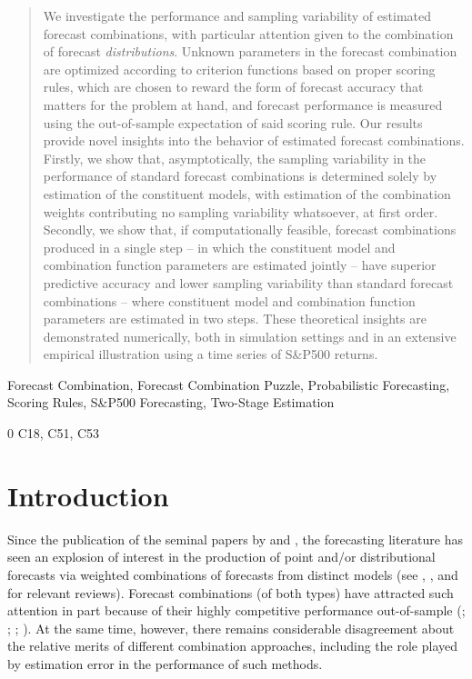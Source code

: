 \documentclass[12pt]{article}
\newcommand{\blind}{0}
\theoremstyle{definition}
\theoremstyle{remark}
\begin{document}
\bigskip
\begin{abstract}
We investigate the performance and sampling variability of estimated forecast combinations, with particular attention given to the combination of forecast \textit{distributions}. Unknown parameters in the forecast combination are optimized according to criterion functions based on proper scoring rules, which are chosen to reward the form of forecast accuracy that matters for the problem at hand, and forecast performance is measured using the out-of-sample expectation of said scoring rule. Our results provide novel insights into the behavior of estimated forecast combinations. Firstly, we show that, {asymptotically}, the sampling variability in the performance of standard forecast combinations is determined {solely} by estimation of the constituent models, with estimation of the combination weights contributing no sampling variability whatsoever, at first order. Secondly, we show that, if computationally feasible, forecast combinations produced in a single step -- in which the constituent model and combination function parameters are estimated jointly -- have superior {predictive }accuracy and lower sampling variability than standard forecast combinations -- where constituent model and combination function parameters are estimated in two steps. These theoretical insights are demonstrated numerically, both in simulation settings and in an extensive empirical illustration using a time series of S\&P500 returns.
\end{abstract}

  Forecast Combination, Forecast Combination Puzzle, Probabilistic Forecasting, Scoring Rules, S\&P500 Forecasting, Two-Stage Estimation

\blind
{
   C18, C51, C53 \\
} \fi

\vfill

\newpage
{}

\section{Introduction}

Since the publication of the seminal papers by \cite{Stone1961} and \cite{Bates1969}, the forecasting literature has seen an explosion of interest in the production of point and/or distributional forecasts via weighted combinations of forecasts from distinct models (see \citealp{Timmermann2006}, \citealp{Aastveit2019}, and \citealp{Wang2022} for relevant reviews). Forecast combinations (of both types) have attracted such attention in part because of their highly competitive performance out-of-sample (\citealp{Makridakis2018, Makridakis2020}; \citealp{Thorey2018}; \citealp{Wang2018}; \citealp{Taylor2020}). At the same time, however, there remains considerable disagreement about the relative merits of different combination approaches, including the role played by estimation error in the performance of such methods.
\end{document}
